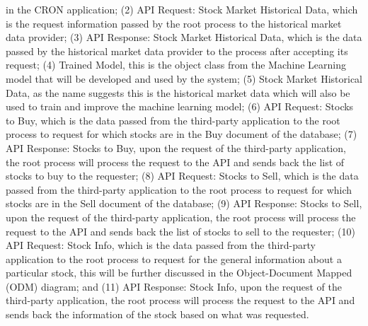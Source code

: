 in the CRON application; 
(2) API Request: Stock Market Historical Data, which is the request 
information passed by the root process to the historical market data provider; 
(3) API Response: Stock Market Historical Data, which is the data passed by the 
historical market data provider to the process after accepting its request; 
(4) Trained Model, this is the object class from the Machine Learning model that 
will be developed and used by the system; 
(5) Stock Market Historical Data, as the name suggests this is the historical 
market data which will also be used to train and improve the machine learning model; 
(6) API Request: Stocks to Buy, which is the data passed from the third-party 
application to the root process to request for which stocks are in the Buy 
document of the database; 
(7) API Response: Stocks to Buy, upon the request of the third-party application, 
the root process will process the request to the API and sends back the 
list of stocks to buy to the requester; 
(8) API Request: Stocks to Sell, which is the data passed from the 
third-party application to the root process to request for which stocks 
are in the Sell document of the database; 
(9) API Response: Stocks to Sell, upon the request of the third-party application, 
the root process will process the request to the API and sends back the list of 
stocks to sell to the requester; 
(10) API Request: Stock Info, which is the data passed from the third-party 
application to the root process to request for the general information about a 
particular stock, this will be further discussed in the Object-Document Mapped 
(ODM) diagram; and 
(11) API Response: Stock Info, upon the request of the third-party application, 
the root process will process the request to the API and sends back the information 
of the stock based on what was requested.
